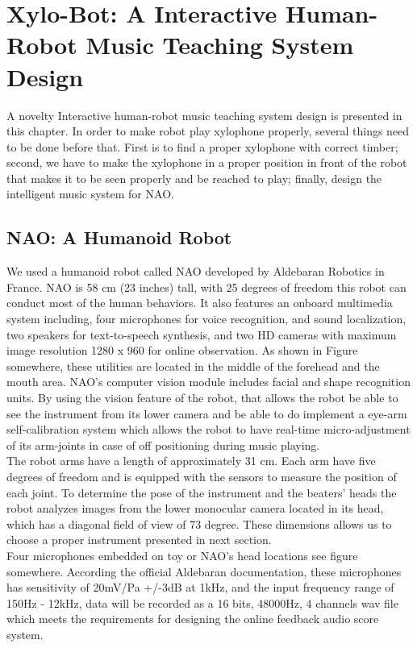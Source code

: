 \chapter{Xylo-Bot: A Interactive Human-Robot Music Teaching System Design} 
A novelty Interactive human-robot music teaching system design is presented in 
this chapter. In order to make robot play xylophone properly, several things need 
to be done before that. First is to find a proper xylophone with correct timber; 
second, we have to make the xylophone in a proper position in front of the robot 
that makes it to be seen properly and be reached to play; finally, design the 
intelligent music system for NAO. \\

\section{NAO: A Humanoid Robot}
We used a humanoid  robot called NAO developed by Aldebaran Robotics in France. 
NAO is 58 cm (23 inches) tall, with 25 degrees of freedom this robot 
can conduct most of the human behaviors. It also features an onboard multimedia 
system including, four microphones for voice recognition, and sound localization, 
two speakers for text-to-speech synthesis, and two HD cameras with maximum image 
resolution 1280 x 960 for online observation. As shown in Figure somewhere, these 
utilities are located in the middle of the forehead and the mouth area. NAO’s 
computer vision module includes facial and shape recognition units. By using the 
vision feature of the robot, that allows the robot be able to see the instrument 
from its lower camera and be able to do implement a eye-arm self-calibration 
system which allows the robot to have real-time micro-adjustment of its 
arm-joints in case of off positioning during music playing.\\

The robot arms have a length of approximately 31 cm. Each arm have five degrees 
of freedom and is equipped with the sensors to measure the position of each 
joint. To determine the pose of the instrument and the beaters' heads the robot 
analyzes images from the lower monocular camera located in its head, which has a 
diagonal field of view of 73 degree. These dimensions allows us to choose a 
proper instrument presented in next section.\\

Four microphones embedded on toy or NAO's head locations see figure somewhere. 
According the official Aldebaran documentation, these microphones has sensitivity 
of 20mV/Pa +/-3dB at 1kHz, and the input frequency range of 150Hz - 12kHz, data 
will be recorded as a 16 bits, 48000Hz, 4 channels wav file which meets the 
requirements for designing the online feedback audio score system.\\

